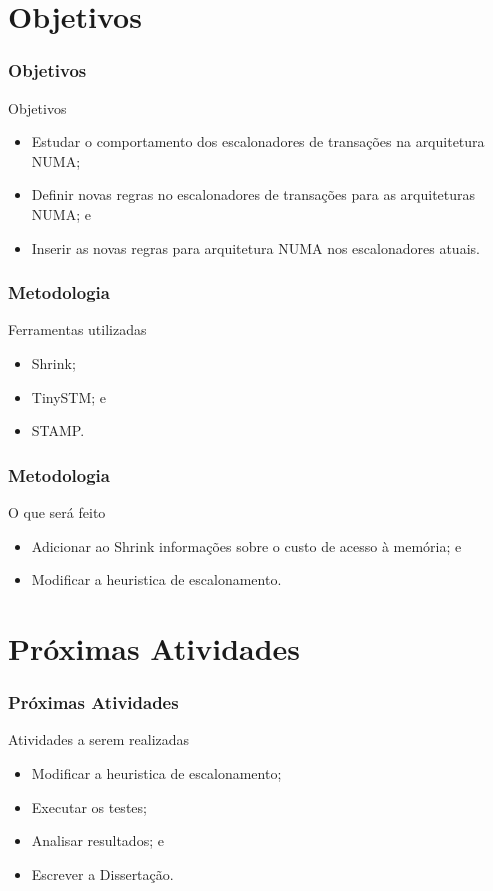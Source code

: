 \documentclass[10pt, pdf,xcolor=pdftex,dvipsnames,table]{beamer}
\begin{document}
\section{Objetivos}
\begin{frame} \frametitle{Objetivos}
\begin{block}{Objetivos}
\begin{itemize}
	\item Estudar o comportamento dos escalonadores de transações na arquitetura NUMA;
	\item Definir novas regras no escalonadores de transações para as arquiteturas NUMA; e
	\item Inserir as novas regras para arquitetura NUMA nos escalonadores atuais.
\end{itemize}
\end{block}
\end{frame}

\begin{frame} \frametitle{Metodologia}
    \begin{block}{Ferramentas utilizadas}
        \begin{itemize}
        	\item Shrink;
        	\item TinySTM; e
        	\item STAMP.
        \end{itemize}
    \end{block}
\end{frame}

\begin{frame} \frametitle{Metodologia}
\begin{block}{O que será feito}
\begin{itemize}
	\item Adicionar ao Shrink informações sobre o custo de acesso à memória; e
	\item Modificar a heuristica de escalonamento.
\end{itemize}
\end{block}
\end{frame}

\section{Próximas Atividades}
\begin{frame} \frametitle{Próximas Atividades}
\begin{block}{Atividades a serem realizadas}
\begin{itemize}
	\item Modificar a heuristica de escalonamento;
	\item Executar os testes;
	\item Analisar resultados; e
	\item Escrever a Dissertação.
\end{itemize}
\end{block}
\end{frame}
\end{document}
